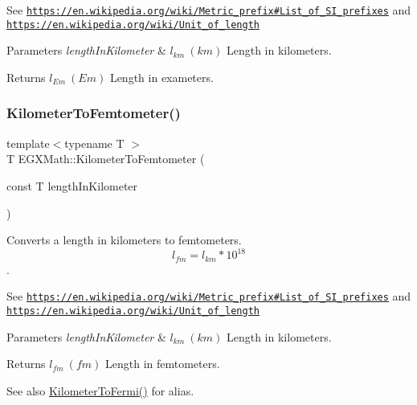See \href{https://en.wikipedia.org/wiki/Metric_prefix#List_of_SI_prefixes}{\tt https\+://en.\+wikipedia.\+org/wiki/\+Metric\+\_\+prefix\#\+List\+\_\+of\+\_\+\+S\+I\+\_\+prefixes} and \href{https://en.wikipedia.org/wiki/Unit_of_length}{\tt https\+://en.\+wikipedia.\+org/wiki/\+Unit\+\_\+of\+\_\+length} 
\begin{DoxyParams}{Parameters}
{\em length\+In\+Kilometer} & $ l_{km}\ (km)$ Length in kilometers. \\
\hline
\end{DoxyParams}
\begin{DoxyReturn}{Returns}
$ l_{Em}\ (Em)$ Length in exameters. 
\end{DoxyReturn}
\mbox{\label{group___e_g_x_math-_conversions-_length_conversions-_kilometer-_s_i_ga74e9c4726fddf2091c1d687e7c5f4b37}} 
\subsubsection{\texorpdfstring{Kilometer\+To\+Femtometer()}{KilometerToFemtometer()}}
{\footnotesize\ttfamily template$<$typename T $>$ \\
T E\+G\+X\+Math\+::\+Kilometer\+To\+Femtometer (\begin{DoxyParamCaption}\item[{const T}]{length\+In\+Kilometer }\end{DoxyParamCaption})}



Converts a length in kilometers to femtometers. \[ l_{fm}=l_{km} * 10^{18} \]. 

See \href{https://en.wikipedia.org/wiki/Metric_prefix#List_of_SI_prefixes}{\tt https\+://en.\+wikipedia.\+org/wiki/\+Metric\+\_\+prefix\#\+List\+\_\+of\+\_\+\+S\+I\+\_\+prefixes} and \href{https://en.wikipedia.org/wiki/Unit_of_length}{\tt https\+://en.\+wikipedia.\+org/wiki/\+Unit\+\_\+of\+\_\+length} 
\begin{DoxyParams}{Parameters}
{\em length\+In\+Kilometer} & $ l_{km}\ (km)$ Length in kilometers. \\
\hline
\end{DoxyParams}
\begin{DoxyReturn}{Returns}
$ l_{fm}\ (fm)$ Length in femtometers. 
\end{DoxyReturn}
\begin{DoxySeeAlso}{See also}
\mbox{\hyperlink{group___e_g_x_math-_conversions-_length_conversions-_kilometer-_non-_s_i_ga9c38d019deb86a60173d5d2b65a1ef57}{Kilometer\+To\+Fermi()}} for alias. 
\end{DoxySeeAlso}
\mbox{\label{group___e_g_x_math-_conversions-_length_conversions-_kilometer-_s_i_gafab6496ea68973d69b855d445c8a62a8}} 

